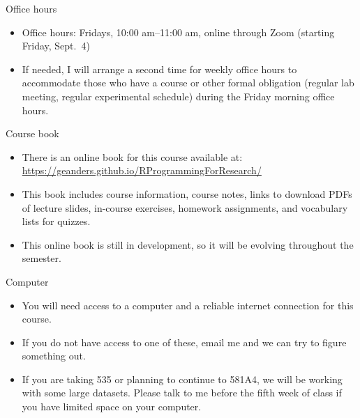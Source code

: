 \documentclass[
  10pt,
  ignorenonframetext,
]{beamer}
\providecommand{\tightlist}{%
  \setlength{\itemsep}{0pt}\setlength{\parskip}{0pt}}
\begin{document}
\begin{frame}{Office hours}
\protect\hypertarget{office-hours}{}

\begin{itemize}
\tightlist
\item
  Office hours: Fridays, 10:00 am--11:00 am, online through Zoom
  (starting Friday, Sept.~4)
\item
  If needed, I will arrange a second time for weekly office hours to
  accommodate those who have a course or other formal obligation
  (regular lab meeting, regular experimental schedule) during the Friday
  morning office hours.
\end{itemize}

\end{frame}

\begin{frame}{Course book}
\protect\hypertarget{course-book}{}

\begin{itemize}
\tightlist
\item
  There is an online book for this course available at:
  \url{https://geanders.github.io/RProgrammingForResearch/}
\item
  This book includes course information, course notes, links to download
  PDFs of lecture slides, in-course exercises, homework assignments, and
  vocabulary lists for quizzes.
\item
  This online book is still in development, so it will be evolving
  throughout the semester. 
\end{itemize}

\end{frame}

\begin{frame}{Computer}
\protect\hypertarget{computer}{}

\begin{itemize}
\tightlist
\item
  You will need access to a computer and a reliable internet connection
  for this course.
\item
  If you do not have access to one of these, email me and we can try to
  figure something out.
\item
  If you are taking 535 or planning to continue to 581A4, we will be
  working with some large datasets. Please talk to me before the fifth
  week of class if you have limited space on your computer.
\end{itemize}

\end{frame}
\end{document}
